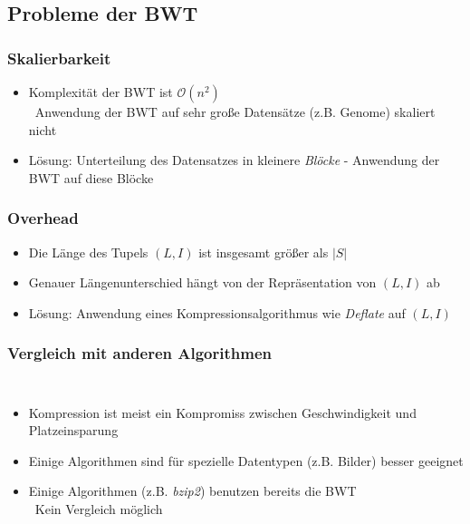 \documentclass[14pt,xcolor=dvipsnames,pdftex]{beamer}
\begin{document}
\subsection{Probleme der BWT}
\begin{frame}
 \frametitle{Skalierbarkeit}
 \begin{itemize}
  \item Komplexität der BWT ist $\mathcal{O}(n^2)$\\
    \textrightarrow \ Anwendung der BWT auf sehr große Datensätze (z.B. Genome) skaliert nicht
  \item Lösung: Unterteilung des Datensatzes in kleinere \textit{Blöcke} - Anwendung der BWT auf diese Blöcke
 \end{itemize}
\end{frame}
\begin{frame}
 \frametitle{Overhead}
 \begin{itemize}
  \item Die Länge des Tupels $(L,I)$ ist insgesamt größer als $|S|$
  \item Genauer Längenunterschied hängt von der Repräsentation von $(L,I)$ ab
  \item Lösung: Anwendung eines Kompressionsalgorithmus wie \textit{Deflate} auf $(L,I)$
  \end{itemize}
\end{frame}
\begin{frame}
 \frametitle{Vergleich mit anderen Algorithmen}
 \begin{columns}[c,onlytextwidth]
    \begin{itemize}
    \item Kompression ist meist ein Kompromiss zwischen Geschwindigkeit und Platzeinsparung
    \item Einige Algorithmen sind für spezielle Datentypen (z.B. Bilder) besser geeignet
    \item Einige Algorithmen (z.B. \textit{bzip2}) benutzen bereits die BWT\\
    \textrightarrow\ Kein Vergleich möglich
    \end{itemize}
 \end{columns}
\end{frame}
\end{document}
